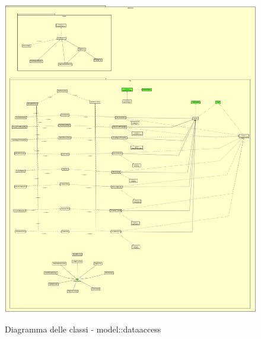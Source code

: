 \documentclass[../DefinizioneDiProdotto.tex]{subfiles}
\begin{document}
\begin{figure}[H]
	\includegraphics[width=\textwidth]{diagrams/ModelCompleteNoMethods/PNGpackage/dataaccess}
	\label{dataaccessPackage}
	\caption{Diagramma delle classi - model::dataaccess}
\end{figure}
\end{document}
